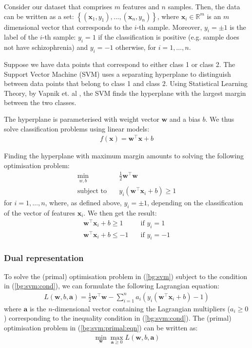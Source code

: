 \documentclass[12pt, twoside, a4paper]{article}
\def\vec{\boldsymbol}
\begin{document}
Consider our dataset that comprises $m$ features and $n$ samples. Then, the data can be written as a set: $\left\lbrace (\boldsymbol{x}_1, y_1), \dots, (\boldsymbol{x}_n, y_n) \right\rbrace$, where $\boldsymbol{x}_i \in \mathbb{R}^m$ is an $m$ dimensional vector that corresponds to the $i$-th sample. Moreover, $y_i = \pm 1$ is the label of the $i$-th sample: $y_i = 1$ if the classification is positive (e.g. sample does not have schizophrenia) and $y_i = -1$ otherwise, for $i = 1, \dots , n$.

Suppose we have data points that correspond to either class 1 or class 2. The Support Vector Machine (SVM) \cite{RefWorks:122} uses a separating hyperplane to distinguish between data points that belong to class 1 and class 2. Using Statistical Learning Theory, by Vapnik et. al \cite{RefWorks:122}, the SVM finds the hyperplane with the largest margin between the two classes.

The hyperplane is parameterised with weight vector $\boldsymbol w$ and a bias $b$. We thus solve classification problems using linear models:
\begin{align}
f(\vec{x}) = \vec{w}^\top \vec{x} + b \label{bg:svm:linear_model}
\end{align}

Finding the hyperplane with maximum margin amounts to solving the following optimisation problem:
\begin{align}
\min_{w, b} \quad &\frac{1}{2} \boldsymbol w^\top \boldsymbol w \label{bg:svm} \\
\text{subject to} \quad & y_i(\boldsymbol w^\top \boldsymbol x_i + b) \geq 1 \label{bg:svm:cond} 
\end{align}
for $i = 1, \dots , n$, where, as defined above, $y_i = \pm 1$, depending on the classification of the vector of features $\boldsymbol x_i$. We then get the result:
\begin{align*}
\boldsymbol w^\top \boldsymbol x_i + b \geq 1 \quad &\text{if $y_i = 1$} \\
\boldsymbol w^\top \boldsymbol x_i + b \leq -1 \quad &\text{if $y_i = -1$}
\end{align*}

\subsubsection{Dual representation}
To solve the (primal) optimisation problem in (\ref{bg:svm}) subject to the condition in (\ref{bg:svm:cond}), we can formulate the following Lagrangian equation:
\begin{align}
L(\boldsymbol w, b, \boldsymbol a)
= \frac{1}{2} \boldsymbol w^\top \boldsymbol w - \sum_{i=1}^n a_i (y_i(\boldsymbol w^\top \boldsymbol x_i + b) - 1) \label{bg:svm:primal:eqn}
\end{align}
where $\boldsymbol a$ is the $n$-dimensional vector containing the Lagrangian multipliers ($a_i \geq 0$) corresponding to the inequality condition in (\ref{bg:svm:cond}). The (primal) optimisation problem in (\ref{bg:svm:primal:eqn}) can be written as:
\begin{align}
\min_{\boldsymbol w} \max_{\boldsymbol a \geq 0} L(\boldsymbol w, b, \vec a) \label{bg:svm:primal}
\end{align}
\end{document}
